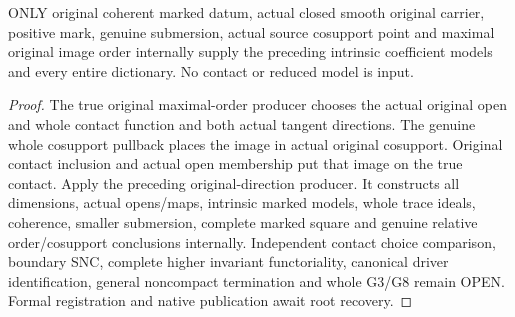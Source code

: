 \begin{theorem}
\label{hir:submersion-contact-param-coeff-original-only-consumer}
\leanok
ONLY original coherent marked datum, actual closed smooth original carrier,
positive mark, genuine submersion, actual source cosupport point and maximal
original image order internally supply the preceding intrinsic coefficient
models and every entire dictionary. No contact or reduced model is input.
\end{theorem}
\begin{proof}
The true original maximal-order producer chooses the actual original open
and whole contact function and both actual tangent directions. The genuine
whole cosupport pullback places the image in actual original cosupport.
Original contact inclusion and actual open membership put that image on the
true contact. Apply the preceding original-direction producer. It constructs
all dimensions, actual opens/maps, intrinsic marked models, whole trace
ideals, coherence, smaller submersion, complete marked square and genuine
relative order/cosupport conclusions internally. Independent contact choice
comparison, boundary SNC, complete higher invariant functoriality, canonical
driver identification, general noncompact termination and whole G3/G8 remain
OPEN. Formal registration and native publication await root recovery.
\end{proof}
